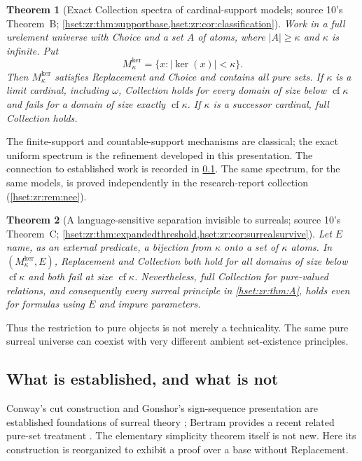 \documentclass[11pt,letterpaper]{article}
\newtheorem{theorem}{Theorem}[section]
\theoremstyle{definition}
\theoremstyle{remark}
\newcommand{\cf}{\operatorname{cf}}
\newcommand{\kerat}{\operatorname{ker}}
\newcommand{\Mker}{M^{\mathrm{ker}}}
\begin{document}
\begin{theorem}[Exact Collection spectra of cardinal-support models; source 10's Theorem~B; \cref{hset:zr:thm:supportbase,hset:zr:cor:classification}]
\label{hset:zr:thm:B}
Work in a full urelement universe with Choice and a set $A$ of atoms, where $|A|\geq\kappa$ and $\kappa$ is infinite. Put
\[
\Mker_\kappa=\{x:|\kerat(x)|<\kappa\}.
\]
Then $\Mker_\kappa$ satisfies Replacement and Choice and contains all pure sets. If $\kappa$ is a limit cardinal, including $\omega$, Collection holds for every domain of size below $\cf\kappa$ and fails for a domain of size exactly $\cf\kappa$. If $\kappa$ is a successor cardinal, full Collection holds.
\end{theorem}
The finite-support and countable-support mechanisms are classical; the exact uniform spectrum is the refinement developed in this presentation. The connection to established work is recorded in \cref{hset:zr:sec:literature}. The same spectrum, for the same models, is proved independently in the research-report collection (\cref{hset:zr:rem:nee}).

\begin{theorem}[A language-sensitive separation invisible to surreals; source 10's Theorem~C; \cref{hset:zr:thm:expandedthreshold,hset:zr:cor:surrealsurvive}]
\label{hset:zr:thm:C}
Let $E$ name, as an external predicate, a bijection from $\kappa$ onto a set of $\kappa$ atoms. In $(\Mker_\kappa,E)$, Replacement and Collection both hold for all domains of size below $\cf\kappa$ and both fail at size $\cf\kappa$. Nevertheless, full Collection for pure-valued relations, and consequently every surreal principle in \cref{hset:zr:thm:A}, holds even for formulas using $E$ and impure parameters.
\end{theorem}
Thus the restriction to pure objects is not merely a technicality. The same pure surreal universe can coexist with very different ambient set-existence principles.

\subsection{What is established, and what is not}
\label{hset:zr:sec:literature}
Conway's cut construction and Gonshor's sign-sequence presentation are established foundations of surreal theory \cite{Conway,Gonshor}; Bertram provides a recent related pure-set treatment \cite{Bertram}. The elementary simplicity theorem itself is not new. Here its construction is reorganized to exhibit a proof over a base without Replacement.
\end{document}
